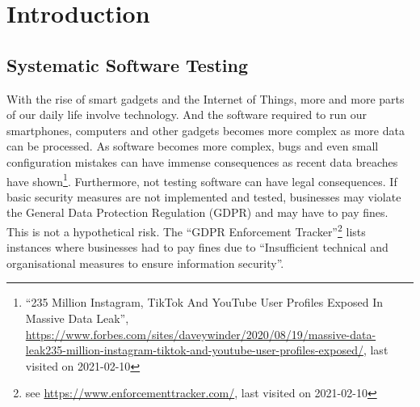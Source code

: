 \chapter{Introduction}\label{sec:introduction}


\section{Systematic Software Testing}\label{sec:introduction_software_testing}

With the rise of smart gadgets and the Internet of Things, more and more parts of our daily life involve technology.
And the software required to run our smartphones, computers and other gadgets  becomes more complex as more data can be processed.
As software becomes more complex, bugs and even small configuration mistakes can have immense consequences as recent data breaches have shown\footnote{\enquote{235 Million Instagram, TikTok And YouTube User Profiles Exposed In Massive Data Leak}, \url{https://www.forbes.com/sites/daveywinder/2020/08/19/massive-data-leak235-million-instagram-tiktok-and-youtube-user-profiles-exposed/}, last visited on 2021-02-10}.
Furthermore, not testing software can have legal consequences.
If basic security measures are not implemented and tested, businesses may violate the General Data Protection Regulation (GDPR) and may have to pay fines.
This is not a hypothetical risk.
The \enquote{GDPR Enforcement Tracker}\footnote{see \url{https://www.enforcementtracker.com/}, last visited on 2021-02-10} lists instances where businesses had to pay fines due to \enquote{Insufficient technical and organisational measures to ensure information security}.

